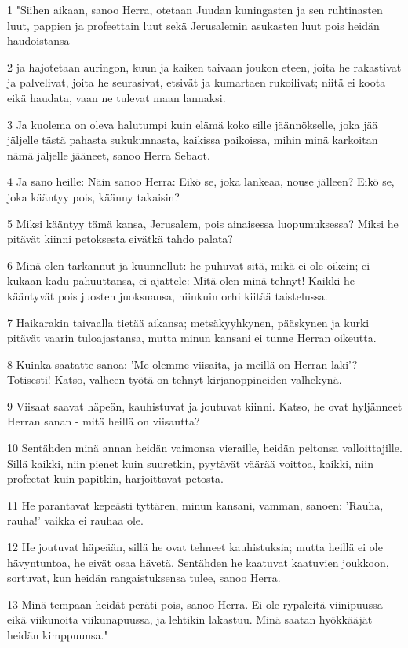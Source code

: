 \par 1 "Siihen aikaan, sanoo Herra, otetaan Juudan kuningasten ja sen ruhtinasten luut, pappien ja profeettain luut sekä Jerusalemin asukasten luut pois heidän haudoistansa
\par 2 ja hajotetaan auringon, kuun ja kaiken taivaan joukon eteen, joita he rakastivat ja palvelivat, joita he seurasivat, etsivät ja kumartaen rukoilivat; niitä ei koota eikä haudata, vaan ne tulevat maan lannaksi.
\par 3 Ja kuolema on oleva halutumpi kuin elämä koko sille jäännökselle, joka jää jäljelle tästä pahasta sukukunnasta, kaikissa paikoissa, mihin minä karkoitan nämä jäljelle jääneet, sanoo Herra Sebaot.
\par 4 Ja sano heille: Näin sanoo Herra: Eikö se, joka lankeaa, nouse jälleen? Eikö se, joka kääntyy pois, käänny takaisin?
\par 5 Miksi kääntyy tämä kansa, Jerusalem, pois ainaisessa luopumuksessa? Miksi he pitävät kiinni petoksesta eivätkä tahdo palata?
\par 6 Minä olen tarkannut ja kuunnellut: he puhuvat sitä, mikä ei ole oikein; ei kukaan kadu pahuuttansa, ei ajattele: Mitä olen minä tehnyt! Kaikki he kääntyvät pois juosten juoksuansa, niinkuin orhi kiitää taistelussa.
\par 7 Haikarakin taivaalla tietää aikansa; metsäkyyhkynen, pääskynen ja kurki pitävät vaarin tuloajastansa, mutta minun kansani ei tunne Herran oikeutta.
\par 8 Kuinka saatatte sanoa: 'Me olemme viisaita, ja meillä on Herran laki'? Totisesti! Katso, valheen työtä on tehnyt kirjanoppineiden valhekynä.
\par 9 Viisaat saavat häpeän, kauhistuvat ja joutuvat kiinni. Katso, he ovat hyljänneet Herran sanan - mitä heillä on viisautta?
\par 10 Sentähden minä annan heidän vaimonsa vieraille, heidän peltonsa valloittajille. Sillä kaikki, niin pienet kuin suuretkin, pyytävät väärää voittoa, kaikki, niin profeetat kuin papitkin, harjoittavat petosta.
\par 11 He parantavat kepeästi tyttären, minun kansani, vamman, sanoen: 'Rauha, rauha!' vaikka ei rauhaa ole.
\par 12 He joutuvat häpeään, sillä he ovat tehneet kauhistuksia; mutta heillä ei ole hävyntuntoa, he eivät osaa hävetä. Sentähden he kaatuvat kaatuvien joukkoon, sortuvat, kun heidän rangaistuksensa tulee, sanoo Herra.
\par 13 Minä tempaan heidät peräti pois, sanoo Herra. Ei ole rypäleitä viinipuussa eikä viikunoita viikunapuussa, ja lehtikin lakastuu. Minä saatan hyökkääjät heidän kimppuunsa."
